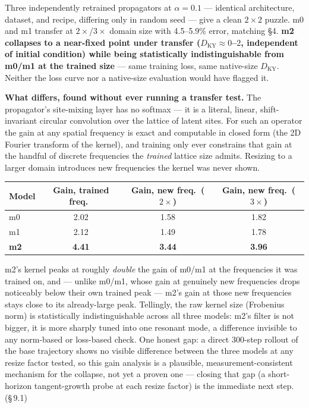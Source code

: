 \documentclass[11pt]{article}
\begin{document}
Three independently retrained propagators at $\alpha=0.1$ --- identical
architecture, dataset, and recipe, differing only in random seed --- give
a clean $2\times2$ puzzle. m0 and m1 transfer at $2\times$/$3\times$
domain size with 4.5--5.9\% error, matching \S4. \textbf{m2 collapses to
a near-fixed point under transfer ($D_{\mathrm{KY}}\approx0$--$2$,
independent of initial condition) while being statistically
indistinguishable from m0/m1 at the trained size} --- same training loss,
same native-size $D_{\mathrm{KY}}$. Neither the loss curve nor a
native-size evaluation would have flagged it.

\textbf{What differs, found without ever running a transfer test.} The
propagator's site-mixing layer has no softmax --- it is a literal,
linear, shift-invariant circular convolution over the lattice of latent
sites. For such an operator the gain at any spatial frequency is exact
and computable in closed form (the 2D Fourier transform of the kernel),
and training only ever constrains that gain at the handful of discrete
frequencies the \emph{trained} lattice size admits. Resizing to a larger
domain introduces new frequencies the kernel was never shown.

\begin{center}
\begin{tabular}{lccc}
\toprule
Model & Gain, trained freq.\ & Gain, new freq.\ ($2\times$) & Gain, new freq.\ ($3\times$) \\
\midrule
m0 & 2.02 & 1.58 & 1.82 \\
m1 & 2.12 & 1.49 & 1.78 \\
\textbf{m2} & \textbf{4.41} & \textbf{3.44} & \textbf{3.96} \\
\bottomrule
\end{tabular}
\end{center}

m2's kernel peaks at roughly \emph{double} the gain of m0/m1 at the
frequencies it was trained on, and --- unlike m0/m1, whose gain at
genuinely new frequencies drops noticeably below their own trained peak
--- m2's gain at those new frequencies stays close to its already-large
peak. Tellingly, the raw kernel size (Frobenius norm) is statistically
indistinguishable across all three models: m2's filter is not bigger, it
is more sharply tuned into one resonant mode, a difference invisible to
any norm-based or loss-based check. One honest gap: a direct 300-step
rollout of the base trajectory shows no visible difference between the
three models at any resize factor tested, so this gain analysis is a
plausible, measurement-consistent mechanism for the collapse, not yet a
proven one --- closing that gap (a short-horizon tangent-growth probe at
each resize factor) is the immediate next step. (\S\,9.1)
\end{document}
